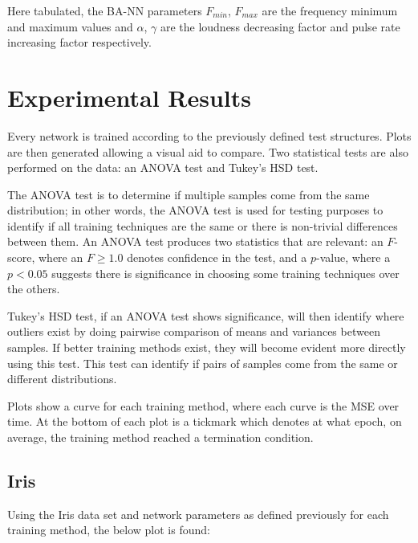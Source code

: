 \documentclass[a4paper,12pt]{article}
\begin{document}
Here tabulated, the BA-NN parameters $F_{min}$, $F_{max}$ are the frequency minimum and maximum values and $\alpha$, $\gamma$ are the loudness decreasing factor and pulse rate increasing factor respectively.

\section{Experimental Results}

Every network is trained according to the previously defined test structures. Plots are then generated allowing a visual aid to compare. Two statistical tests are also performed on the data: an ANOVA test and Tukey's HSD test.

The ANOVA test is to determine if multiple samples come from the same distribution; in other words, the ANOVA test is used for testing purposes to identify if all training techniques are the same or there is non-trivial differences between them. An ANOVA test produces two statistics that are relevant: an $F$-score, where an $F \geq 1.0$ denotes confidence in the test, and a $p$-value, where a $p <0.05$ suggests there is significance in choosing some training techniques over the others.

Tukey's HSD test, if an ANOVA test shows significance, will then identify where outliers exist by doing pairwise comparison of means and variances between samples. If better training methods exist, they will become evident more directly using this test. This test can identify if pairs of samples come from the same or different distributions.

Plots show a curve for each training method, where each curve is the MSE over time. At the bottom of each plot is a tickmark which denotes at what epoch, on average, the training method reached a termination condition.

\subsection{Iris}

Using the Iris data set and network parameters as defined previously for each training method, the below plot is found:
\end{document}
